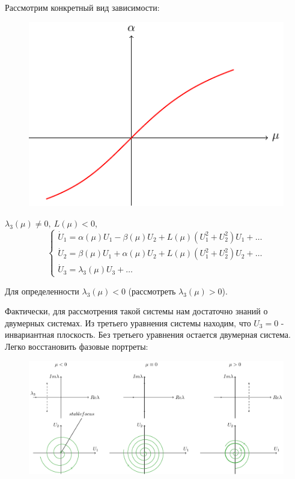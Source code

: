 Рассмотрим конкретный вид зависимости:
\begin{figure} 
	\vspace{0.1em}
	\centering
	\includegraphics[scale=1]{fig/fig53.pdf}
	\vspace{-0.25em}
\end{figure}

$\lambda_3(\mu)\neq 0,~L(\mu)<0$,
\begin{equation}
	\begin{cases}
		\dot U_1 = \alpha(\mu)U_1-\beta(\mu)U_2+L(\mu)(U_1^2+U_2^2)U_1+\dots \\
		\dot U_2 = \beta(\mu)U_1+\alpha(\mu)U_2+L(\mu)(U_1^2+U_2^2)U_2+\dots \\
		\dot U_3 = \lambda_3(\mu)U_3+\dots
	\end{cases}
	\label{eq:108}	
\end{equation}

 Для определенности $\lambda_3(\mu)<0$ (рассмотреть $\lambda_3(\mu)>0$).

 Фактически, для рассмотрения такой системы нам достаточно знаний о двумерных системах. Из третьего уравнения системы находим, что $U_3=0$ - инвариантная плоскость. Без третьего уравнения остается двумерная система. Легко восстановить фазовые портреты:
 \begin{figure}[H]
	\centering
	\includegraphics[width=1\linewidth]{fig/fig54.pdf}   
\end{figure}

